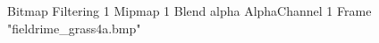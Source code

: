 {Bitmap
	{Filtering 1}
	{Mipmap 1}
	{Blend alpha}
	{AlphaChannel 1}
	{Frame "fieldrime_grass4a.bmp"}
}
